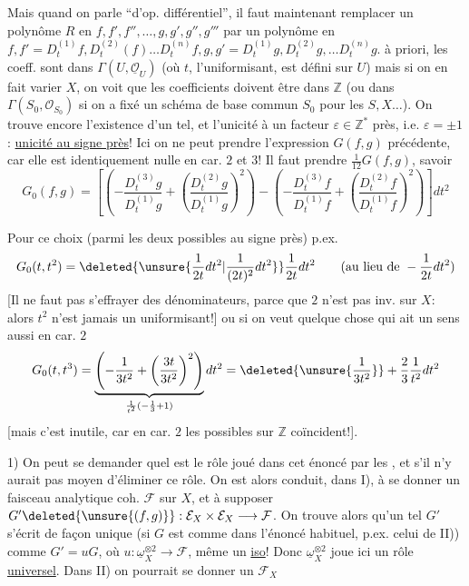 Mais quand on parle ``d'op. différentiel'', il faut maintenant remplacer
un polynôme $R$ en $f,f',f'',\ldots,g,g',g'',g'''$ par un
polynôme en
$f,f'=D_t^{(1)}f,D_t^{(2)}(f)\ldots D_t^{(n)}f,
g,g'=D_t^{(1)}g,D_t^{(2)}g,\ldots D_t^{(n)}g$.
 à priori, les coeff.
sont dans $\Gamma(U,\underline{\mathcal{O}}_U)$
(où $t$, l'uniformisant, est défini sur $U$)
mais si on  en fait varier $X$, on
voit que les coefficients doivent être dans \uline{$\mathbb{Z}$}
(ou dans $\Gamma(S_0,\mathcal{O}_{S_0})$ si on a fixé un schéma de base
commun $S_0$ pour les $S,X\ldots$).
On trouve encore l'existence d'un tel, et l'unicité
à un facteur $\varepsilon\in\mathbb{Z}^{*}$ près, i.e. $\varepsilon=\pm1$:
\uline{unicité au signe près}! Ici on ne peut
prendre l'expression $G(f,g)$ précédente, car elle est
identiquement nulle en car. $2$ et $3$! Il faut
prendre $\frac1{12}G(f,g)$, savoir
\[
G_0(f,g)=\left[
\left(-\frac{D_t^{(3)}g}{D_t^{(1)}g}
+\left(\frac{D_t^{(2)}g}{D_t^{(1)}g}\right)^2\right)
-\left(-\frac{D_t^{(3)}f}{D_t^{(1)}f}
+\left(\frac{D_t^{(2)}f}{D_t^{(1)}f}\right)^2\right)
\right]dt^2
\]

Pour  ce choix (parmi les deux
possibles au signe près)  p.ex.
\[
G_0(t,t^2)=\deleted{\unsure{\frac1{2t}dt^2|\frac1{(2t)^2}dt^2}}
\frac1{2t}dt^2\qquad
(\text{au lieu de }-\frac1{2t}dt^2)
\]
[Il ne faut pas s'effrayer des dénominateurs, parce que
 $2$ n'est pas inv. sur $X$: alors $t^2$ n'est jamais
un uniformisant!] ou si on veut quelque chose
qui ait un sens aussi en car. $2$
\[
G_0(t,t^3)=
\underbrace{\left(-\frac1{3t^2}+\left(\frac{3t}{3t^2}\right)^2\right)}_
{\frac1{t^2}(-\frac13+1)}dt^2
=\deleted{\unsure{\frac1{3t^2}}}+\frac23\frac1{t^2}dt^2
\]
[mais c'est inutile, car en car. $2$ les 
 possibles sur $\mathbb{Z}$ coïncident!].

\uline{} 1) On peut se demander quel est le rôle joué dans
cet énoncé par les , et s'il n'y aurait pas
moyen d'éliminer ce rôle. On est alors conduit,
dans I), à se donner un faisceau analytique
coh. $\mathcal{F}$ sur $X$, et à supposer
$G'\deleted{\unsure{(f,g)}}:\mathcal{E}_X\times\mathcal{E}_X\longrightarrow\mathcal{F}$.
On trouve alors qu'un tel $G'$ s'écrit de façon unique
(si $G$ est comme dans l'énoncé habituel, p.ex. celui de
II)) comme $G'=uG$, où $u:\underline{\omega}_X^{\otimes2}\longrightarrow\mathcal{F}$,
 même un \uline{iso}!
Donc $\underline{\omega}_X^{\otimes2}$ joue ici un rôle \uline{universel}.
Dans II) on pourrait se donner un $\mathcal{F}_X$ 

